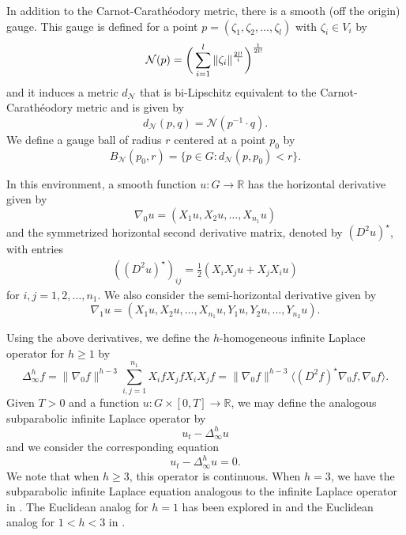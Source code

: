 \documentclass[12pt]{amsart}
\theoremstyle{definition}
\theoremstyle{remark}
\numberwithin{equation}{section}
\begin{document}
In addition to the Carnot-Carath\'{e}odory metric, there is a smooth (off the origin) gauge.  This gauge is defined for a point $p=(\zeta_1, \zeta_2, \ldots, \zeta_l)$
with $\zeta_i \in V_i$ by 
\begin{equation}\label{gaugedef}
\mathcal{N}(p)=\bigg(\sum_{i=1}^l  \|\zeta_{i}\|^{\frac{{\displaystyle} 2l!}{{\displaystyle} i}}
\bigg )^\frac{{\displaystyle} 1}{{\displaystyle} 2l!}
\end{equation}
and it induces a metric $d_{\mathcal{N}}$ that is bi-Lipschitz equivalent to the 
Carnot-Carath\'{e}odory metric and is given by
$$d_{\mathcal{N}}(p,q) = \mathcal{N}(p^{-1}\cdot q).$$ We define a gauge ball 
of radius $r$ centered at a
point $p_0$ by $$B_{\mathcal{N}}(p_0,r)=\{p\in G : d_{\mathcal{N}}(p,p_0) < r\}.$$

In this environment, a smooth function $u: G \to \mathbb{R}$ has the horizontal derivative given by
$$\nabla_0 u=(X_1u,X_2u, \ldots, X_{n_1}u )$$ and the symmetrized horizontal second derivative matrix, 
denoted by $(D^2u)^\star$, with entries
\begin{eqnarray*} 
((D^2u)^\star)_{ij} =  \frac{1}{2} (X_iX_ju+X_jX_iu) 
\end{eqnarray*} 
for $i,j=1,2,\ldots , n_1.$  We also consider the semi-horizontal derivative given by 
$$\nabla_1 u=(X_1u,X_2u, \ldots, X_{n_1}u, Y_1u,Y_2u, \ldots, Y_{n_2}u).$$

Using the above derivatives, we define the $h$-homogeneous infinite Laplace operator for $h\geq 1$ by
\begin{equation*}
\Delta^h_{\infty}f  = \|\nabla_0 f\|^{h-3} \sum_{i,j=1}^{n_1} X_ifX_jfX_iX_jf =  \|\nabla_0 f\|^{h-3}{\ensuremath{\langle {(D^2f)^{\star}\nabla_0f} , {\nabla_0f} \rangle}}.
 
\end{equation*}
Given $T>0$ and a function $u:G \times [0,T] \to \mathbb{R}$, we may define the analogous subparabolic infinite Laplace operator by 
$$u_t-\Delta^h_{\infty}u$$ and we consider the corresponding equation
\begin{equation}\label{eqmain}
u_t-\Delta^h_{\infty}u=0.
\end{equation}
We note that when $h\geq 3$, this operator is continuous. When $h=3$, we have the subparabolic infinite Laplace equation analogous to the infinite Laplace operator in \cite{B:MP}. The Euclidean analog for $h=1$ has been explored in  \cite{JK:JK} and the Euclidean analog for $1<h<3$ in \cite{PV}. 
 
\end{document}
